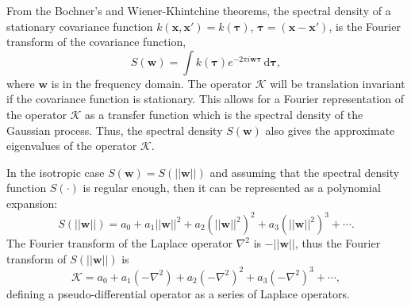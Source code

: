 From the Bochner’s and Wiener-Khintchine theorems, the spectral density of a stationary covariance function $k(\bm{x},\bm{x}') = k(\bm{\tau})$, $\bm{\tau}=(\bm{x}-\bm{x}')$, is the Fourier transform of the covariance function,
%
\begin{equation*}
S(\bm{w}) = \int k(\bm{\tau}) e^{-2\pi i \bm{w} \bm{\tau}} \,\mathrm{d}\bm{\tau}, \nonumber
\end{equation*}
where $\bm{w}$ is in the frequency domain. The operator $\mathcal{K}$ will be translation invariant if the covariance function is stationary. This allows for a Fourier representation of the operator $\mathcal{K}$ as a transfer function which is the spectral density of the Gaussian process. 
Thus, the spectral density $S(\bm{w})$ also gives the approximate eigenvalues of the operator $\mathcal{K}$.

In the isotropic case $S(\bm{w}) = S(||\bm{w}||)$ and assuming that the spectral density function $S(\cdot)$ is regular enough, then it can be represented as a polynomial expansion:
%
\begin{equation}\label{eq_S}
S(||\bm{w}||)=a_0+a_1||\bm{w}||^2+a_2(||\bm{w}||^2)^2+a_3(||\bm{w}||^2)^3+\cdots.
\end{equation}
The Fourier transform of the Laplace operator $\nabla^2$ is $-||\bm{w}||$, thus the Fourier transform of $S(||\bm{w}||)$ is
%
\begin{equation}\label{eq_K}
\mathcal{K}=a_0+a_1(-\nabla^2)+a_2(-\nabla^2)^2+a_3(-\nabla^2)^3+\cdots,
\end{equation}
defining a pseudo-differential operator as a series of Laplace operators.

